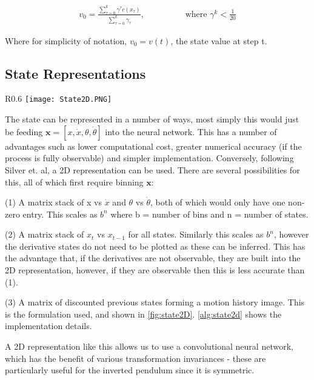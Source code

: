 \documentclass[../main.tex]{subfiles}
\begin{document}
\begin{align}
   v_0 = \frac{\sum_{\tau=0}^{k} \gamma^\tau c(x_\tau ) }{\sum_{\tau = 0}^k \gamma_\tau}, \hspace{2cm} \text{where } \gamma^k < \frac{1}{20}
\end{align}

Where for simplicity of notation, $v_0 = v(t)$, the state value at step t.

\subsection{State Representations}

\begin{wrapfigure}{R}{0.6\textwidth}
   \centering
   \texttt{[image: State2D.PNG]}
   \caption{An example of a 2D state representation where there are 20 bins and 17 random actions have been taken.}
   \vspace{0.5cm}
   \label{fig:state2D}
\end{wrapfigure}

The state can be represented in a number of ways, most simply this would just be feeding $\boldsymbol{x} = [x, \dot{x}, \theta, \dot{\theta}]$ into the neural network. This has a number of advantages such as lower computational cost, greater numerical accuracy (if the process is fully observable) and simpler implementation. Conversely, following Silver et. al, a 2D representation can be used. There are several possibilities for this, all of which first require binning $\boldsymbol{x}$:

(1) A matrix stack of x vs $\dot{x}$ and $\theta$ vs $\dot{\theta}$, both of which would only have one non-zero entry. This scales as $b^n$ where b = number of bins and n = number of states.

(2) A matrix stack of $x_t$ vs $x_{t-1}$ for all states. Similarly this scales as $b^n$, however the derivative states do not need to be plotted as these can be inferred. This has the advantage that, if the derivatives are not observable, they are built into the 2D representation, however, if they are observable then this is less accurate than (1).

(3) A matrix of discounted previous states forming a motion history image. This is the formulation used, and shown in \cref{fig:state2D}. \cref{alg:state2d} shows the implementation details.

A 2D representation like this allows us to use a convolutional neural network, which has the benefit of various transformation invariances - these are particularly useful for the inverted pendulum since it is symmetric.
\end{document}
